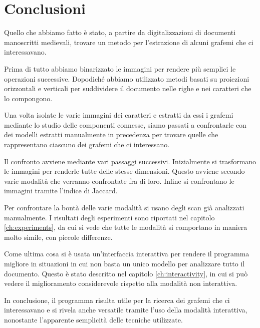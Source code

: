 \chapter{Conclusioni}\label{ch:conclusioni}

Quello che abbiamo fatto \`e stato, a partire da digitalizzazioni di documenti manoscritti medievali, trovare un metodo per l'estrazione di alcuni grafemi che ci interessavano.

Prima di tutto abbiamo binarizzato le immagini per rendere pi\`u semplici le operazioni successive. Dopodich\'e abbiamo utilizzato metodi basati su proiezioni orizzontali e verticali per suddividere il documento nelle righe e nei caratteri che lo compongono.

Una volta isolate le varie immagini dei caratteri e estratti da essi i grafemi mediante lo studio delle componenti connesse, siamo passati a confrontarle con dei modelli estratti manualmente in precedenza per trovare quelle che rappresentano ciascuno dei grafemi che ci interessano.

Il confronto avviene mediante vari passaggi successivi. Inizialmente si trasformano le immagini per renderle tutte delle stesse dimensioni. Questo avviene secondo varie modalit\`a che verranno confrontate fra di loro. Infine si confrontano le immagini tramite l'indice di Jaccard.

Per confrontare la bont\`a delle varie modalit\`a si usano degli scan gi\`a analizzati manualmente. I risultati degli esperimenti sono riportati nel capitolo \ref{ch:experiments}, da cui si vede che tutte le modalit\`a si comportano in maniera molto simile, con piccole differenze.

Come ultima cosa si \`e usata un'interfaccia interattiva per rendere il programma migliore in situazioni in cui non basta un unico modello per analizzare tutto il documento. Questo \`e stato descritto nel capitolo \ref{ch:interactivity}, in cui si pu\`o vedere il miglioramento considerevole rispetto alla modalit\`a non interattiva.

In conclusione, il programma risulta utile per la ricerca dei grafemi che ci interessavano e si rivela anche versatile tramite l'uso della modalit\`a interattiva, nonostante l'apparente semplicit\`a delle tecniche utilizzate.